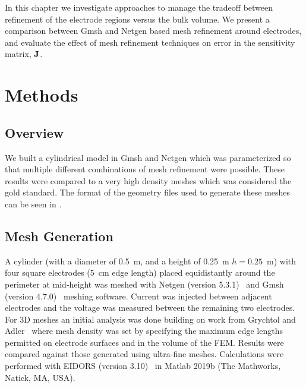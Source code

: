 In this chapter we investigate approaches to manage the tradeoff
between refinement of the electrode regions versus the bulk volume. 
We present a comparison between Gmsh and 
Netgen based mesh refinement around electrodes, and evaluate the 
effect of mesh refinement techniques on error in  the sensitivity matrix, 
$\bf J$. 

\section{Methods}
\subsection{Overview}

We built a cylindrical model in Gmsh and Netgen which was parameterized so that multiple
different combinations of mesh refinement were possible.
These results were compared to a very high density meshes which was considered the gold standard.
The format of the geometry files used to generate these meshes can be seen in .

\subsection{Mesh Generation}
A cylinder (with a diameter of 0.5~m, and a height of 0.25~m $h=0.25$~m) with four square electrodes 
(5~cm edge length) placed equidistantly around the perimeter at mid-height was
meshed with Netgen (version 5.3.1)~\parencite{schoberl_netgen_1997} and Gmsh 
(version 4.7.0)~\parencite{geuzaine_gmsh_2009}
meshing software.
Current was injected between adjacent electrodes and the voltage was measured between the remaining
two electrodes.
For 3D meshes an initial analysis was done building on work from 
Grychtol and Adler~\parencite{grychtol_fem_2013} where mesh density was
set by specifying the maximum edge lengths permitted on electrode surfaces
and in the volume of the FEM.
Results were compared against those generated using ultra-fine meshes. 
Calculations were performed with EIDORS (version 3.10)~\parencite{adler_uses_2006} 
in Matlab 2019b
(The Mathworks, Natick, MA, USA).


